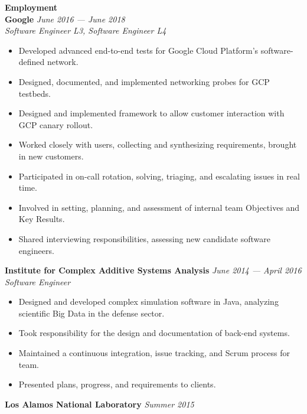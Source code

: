 \documentclass[11pt,a4paper,sans]{article}
\newcommand{\cvcolor}[1]{{\color{MidnightBlue}#1}}
\renewcommand{\section}[1]{
  \cvcolor{\noindent \textbf{\LARGE #1}}
  \vspace{.5em}\\
}
\begin{document}
\section{Employment}
\textbf{Google} \hfill \textsl{June 2016 --- June 2018}\\
\textsl{Software Engineer L3, Software Engineer L4}
\begin{itemize}
  \item Developed advanced end-to-end tests for Google Cloud Platform's software-defined network.
  \item Designed, documented, and implemented networking probes for GCP testbeds.
  \item Designed and implemented framework to allow customer interaction with
    GCP canary rollout.
  \item Worked closely with users, collecting and synthesizing requirements,
    brought in new customers.
  \item Participated in on-call rotation, solving, triaging, and escalating issues in real time.
  \item Involved in setting, planning, and assessment of internal
    team Objectives and Key Results.
  \item Shared interviewing responsibilities, assessing new candidate software engineers.
\end{itemize}
\vspace{0.2em}
\textbf{Institute for Complex Additive Systems Analysis} \hfill \textsl{June 2014 --- April 2016}\\
\textsl{Software Engineer}
\begin{itemize}
  \item Designed and developed complex simulation software in Java, analyzing
    scientific Big Data in the defense sector.
  \item Took responsibility for the design and documentation of back-end
    systems.
  \item Maintained a continuous integration, issue tracking, and Scrum process
    for team.
  \item Presented plans, progress, and requirements to clients.
\end{itemize}
\vspace{0.2em}
\textbf{Los Alamos National Laboratory} \hfill \textsl{Summer 2015}\\
\end{document}
